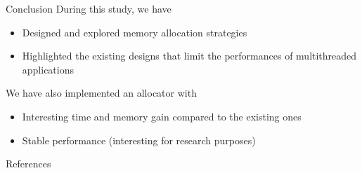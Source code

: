 \documentclass[final]{beamer}
\newlength{\onecolwid}
\begin{document}
\begin{frame}[t]
\begin{columns}[t]
\begin{column}{\onecolwid}
\begin{alertblock}{Conclusion}
During this study, we have
	\begin{itemize}
		\item Designed and explored memory allocation strategies
        \item Highlighted the existing designs that limit the performances of multithreaded applications 
     \end{itemize}
We have also implemented an allocator with
	\begin{itemize}
     	\item Interesting time and memory gain compared to the existing ones
        \item Stable performance (interesting for research purposes)
	\end{itemize}
\end{alertblock}


\begin{block}{References}



\nocite{*} %
\small{
\vspace{0.75in}}

\end{block}


\end{column}	%
\end{columns}	%
\end{frame}		%
\end{document}
